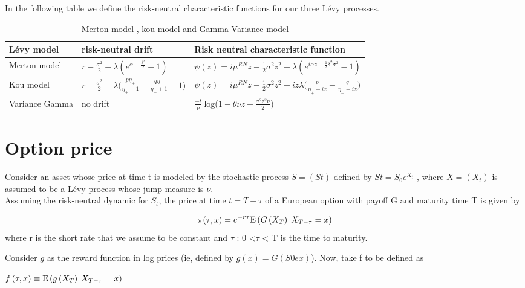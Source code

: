 \documentclass[12pt]{report}
\begin{document}
In the following table we define the risk-neutral characteristic functions for our three Lévy processes.
\begin {table}[h!]
\begin{center}
\renewcommand{\arraystretch}{2}
\begin{tabular}{|l|l|l|}
 \hline
   Lévy model  & risk-neutral drift & Risk neutral characteristic function   \\
 \hline
Merton model  & $r-\frac{\sigma^2}{2}-\lambda (e^{\alpha+\frac{\delta^2}{2}}-1)$ & $\psi (z)= i\mu^{RN}z - \frac{1}{2}\sigma^2  z^2 + \lambda (e^{i \alpha z - \frac{1}{2} \delta ^2 \sigma^2}-1)$  \\
 \hline
 Kou model  & $r-\frac{\sigma^2}{2}-\lambda \big(\frac{p \eta_+}{\eta_+ -1}-\frac{q \eta_-}{\eta_- + 1}-1\big)$ & $\psi (z)= i\mu^{RN}z - \frac{1}{2}\sigma^2  z^2 + i z \lambda \big(\frac{p}{\eta_+- i z}- \frac{q}{\eta_- + i z}\big) $   \\
\hline
Variance Gamma & no drift & $\frac{-t}{\nu}~$log($1-\theta \nu z +\frac{\sigma^2 z^2 \nu}{2}$)  \\
\hline
\end{tabular}
\end{center}
\caption{Merton model , kou model and Gamma Variance model} 
\end{table}
\section{Option price}
Consider an asset whose price at time t is modeled by the stochastic process $S = (St)$
defined by $St = S_0 e^{X_t}$ , where $X = (X_t)$  is assumed to be a Lévy process whose
jump measure is $\nu$.\\
Assuming the risk-neutral dynamic for $S_t$, the price at time $t = T-\tau$  of a European option with payoff G and maturity time T is given by

\begin{gather}
\pi(\tau,x)= e^{-r\tau} \mathrm{E} \left( {{G \left( {X_T} \right)|X_{T-\tau} = x}} \right)
\label{price}
\end{gather}
where r is the short rate that we assume to be constant and $\tau$ : 0 <$\tau$ < T is the time to
maturity.

Consider $g$ as the reward function in log prices (ie, defined by $g(x) = G(S0ex)$). Now, take f to be defined as
\begin{center}
$f \left( {\tau,x} \right) \equiv \mathrm{E} \left( {{g \left( {X_T} \right)|X_{T-\tau} = x}} \right)$
\end{center}
\end{document}
